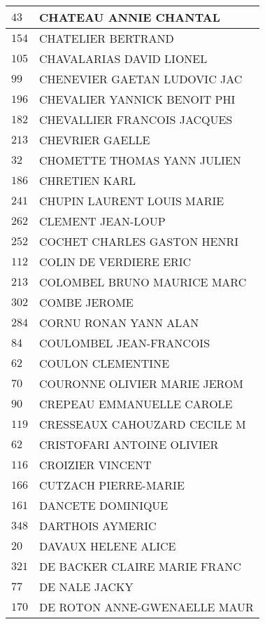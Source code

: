 \begin{xltabular}{\linewidth}{|l|X|}
    $43$ & CHATEAU ANNIE CHANTAL \\
    \hline
    $154$ & CHATELIER BERTRAND \\
    \hline
    $105$ & CHAVALARIAS DAVID LIONEL \\
    \hline
    $99$ & CHENEVIER GAETAN LUDOVIC JAC \\
    \hline
    $196$ & CHEVALIER YANNICK BENOIT PHI \\
    \hline
    $182$ & CHEVALLIER FRANCOIS JACQUES \\
    \hline
    $213$ & CHEVRIER GAELLE \\
    \hline
    $32$ & CHOMETTE THOMAS YANN JULIEN \\
    \hline
    $186$ & CHRETIEN KARL \\
    \hline
    $241$ & CHUPIN LAURENT LOUIS MARIE \\
    \hline
    $262$ & CLEMENT JEAN-LOUP \\
    \hline
    $252$ & COCHET CHARLES GASTON HENRI \\
    \hline
    $112$ & COLIN DE VERDIERE ERIC \\
    \hline
    $213$ & COLOMBEL BRUNO MAURICE MARC \\
    \hline
    $302$ & COMBE JEROME \\
    \hline
    $284$ & CORNU RONAN YANN ALAN \\
    \hline
    $84$ & COULOMBEL JEAN-FRANCOIS \\
    \hline
    $62$ & COULON CLEMENTINE \\
    \hline
    $70$ & COURONNE OLIVIER MARIE JEROM \\
    \hline
    $90$ & CREPEAU EMMANUELLE CAROLE \\
    \hline
    $119$ & CRESSEAUX CAHOUZARD CECILE M \\
    \hline
    $62$ & CRISTOFARI ANTOINE OLIVIER \\
    \hline
    $116$ & CROIZIER VINCENT \\
    \hline
    $166$ & CUTZACH PIERRE-MARIE \\
    \hline
    $161$ & DANCETE DOMINIQUE \\
    \hline
    $348$ & DARTHOIS AYMERIC \\
    \hline
    $20$ & DAVAUX HELENE ALICE \\
    \hline
    $321$ & DE BACKER CLAIRE MARIE FRANC \\
    \hline
    $77$ & DE NALE JACKY \\
    \hline
    $170$ & DE ROTON ANNE-GWENAELLE MAUR \\

\end{xltabular}
